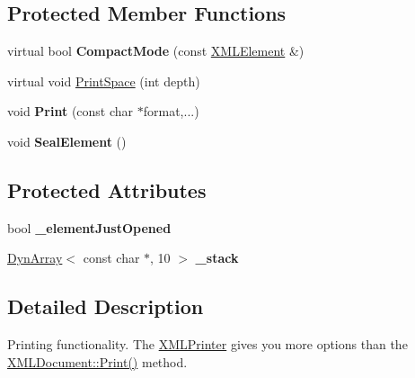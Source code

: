 \subsection*{Protected Member Functions}
\begin{DoxyCompactItemize}
\item 
\hypertarget{classtinyxml2_1_1_x_m_l_printer_a38e1ed5a779bdf63eda9e808f7a6de66}{}virtual bool {\bfseries Compact\+Mode} (const \hyperlink{classtinyxml2_1_1_x_m_l_element}{X\+M\+L\+Element} \&)\label{classtinyxml2_1_1_x_m_l_printer_a38e1ed5a779bdf63eda9e808f7a6de66}

\item 
virtual void \hyperlink{classtinyxml2_1_1_x_m_l_printer_a1c4b2ccbe4fdb316d54f5a93f3559260}{Print\+Space} (int depth)
\item 
\hypertarget{classtinyxml2_1_1_x_m_l_printer_ab30210a7f32e45634e7a45137bf6fdf6}{}void {\bfseries Print} (const char $\ast$format,...)\label{classtinyxml2_1_1_x_m_l_printer_ab30210a7f32e45634e7a45137bf6fdf6}

\item 
\hypertarget{classtinyxml2_1_1_x_m_l_printer_a70ac2010150c8551773ffb2f96fef353}{}void {\bfseries Seal\+Element} ()\label{classtinyxml2_1_1_x_m_l_printer_a70ac2010150c8551773ffb2f96fef353}

\end{DoxyCompactItemize}
\subsection*{Protected Attributes}
\begin{DoxyCompactItemize}
\item 
\hypertarget{classtinyxml2_1_1_x_m_l_printer_ac07169d58b465214a2b1fa306e617c26}{}bool {\bfseries \+\_\+element\+Just\+Opened}\label{classtinyxml2_1_1_x_m_l_printer_ac07169d58b465214a2b1fa306e617c26}

\item 
\hypertarget{classtinyxml2_1_1_x_m_l_printer_a99d59e67e084714541bee3ae43884bef}{}\hyperlink{classtinyxml2_1_1_dyn_array}{Dyn\+Array}$<$ const char $\ast$, 10 $>$ {\bfseries \+\_\+stack}\label{classtinyxml2_1_1_x_m_l_printer_a99d59e67e084714541bee3ae43884bef}

\end{DoxyCompactItemize}


\subsection{Detailed Description}
Printing functionality. The \hyperlink{classtinyxml2_1_1_x_m_l_printer}{X\+M\+L\+Printer} gives you more options than the \hyperlink{classtinyxml2_1_1_x_m_l_document_a686ea28672c0e0c60383ec28148c1ac0}{X\+M\+L\+Document\+::\+Print()} method.

